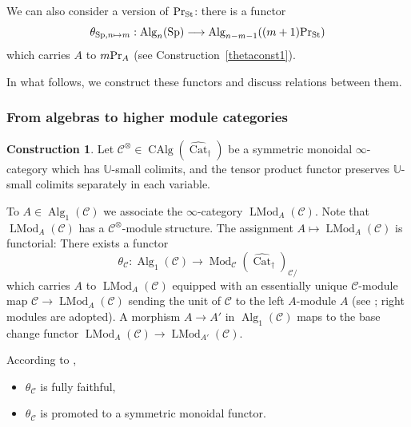 \documentclass[leqno,12pt]{amsart}
\theoremstyle{plain}
\theoremstyle{definition}
\newtheorem{Construction}[Theorem]{Construction}
\newcommand{\CCC}{\mathcal{C}}
\newcommand{\PR}{\textup{Pr}}
\newcommand{\SP}{\operatorname{Sp}}
\newcommand{\Mod}{\operatorname{Mod}}
\newcommand{\Alg}{\operatorname{Alg}}
\newcommand{\CAlg}{\operatorname{CAlg}}
\newcommand{\vCat}{\widehat{\operatorname{Cat}}_\dagger}
\newcommand{\PRST}{\PR_{\textup{St}}}
\newcommand{\LMod}{\operatorname{LMod}}
\newcommand{\UUUU}{\mathbb{U}}
\begin{document}
We can also consider a version of $\PRST$: there is a functor
\[
\theta_{\SP,n\mapsto m}:\Alg_{n}(\SP)\longrightarrow \Alg_{n-m-1}((m+1)\PRST)
\]
which carries $A$ to $m\PR_A$ (see Construction~\ref{thetaconst1}).

In what follows, we construct these functors and discuss relations between them.



\subsubsection{From algebras to higher module categories}


\label{PRA}



\begin{Construction}
\label{cconstruction}
Let $\CCC^\otimes\in \CAlg(\vCat)$ be a symmetric monoidal $\infty$-category which has $\UUUU$-small colimits, and the tensor product
functor preserves $\UUUU$-small colimits separately in each variable.

To $A\in \Alg_1(\CCC)$ we associate the $\infty$-category $\LMod_A(\CCC)$.
Note that $\LMod_A(\CCC)$ has a $\CCC^\otimes$-module structure.
The assignment $A\mapsto \LMod_A(\CCC)$ is functorial: There exists a functor
\[
\theta_{\CCC}:\Alg_1(\CCC)\longrightarrow \Mod_{\CCC}(\vCat)_{\CCC/}
\]
which carries $A$ to $\LMod_A(\CCC)$ equipped with 
an essentially unique $\CCC$-module map $\CCC\to \LMod_A(\CCC)$
sending the unit of $\CCC$ to the left $A$-module $A$ (see \cite[4.8.3]{HA}; right modules are adopted).
A morphism $A\to A'$ in $\Alg_1(\CCC)$ maps to the base change functor
$\LMod_A(\CCC)\to \LMod_{A'}(\CCC)$.

According to \cite[4.8.5.5, 4.8.5.16]{HA},
\begin{itemize}
\item $\theta_{\CCC}$ is fully faithful,

\item $\theta_{\CCC}$ is promoted to a symmetric monoidal functor.


\end{itemize}
\end{Construction}
\end{document}
